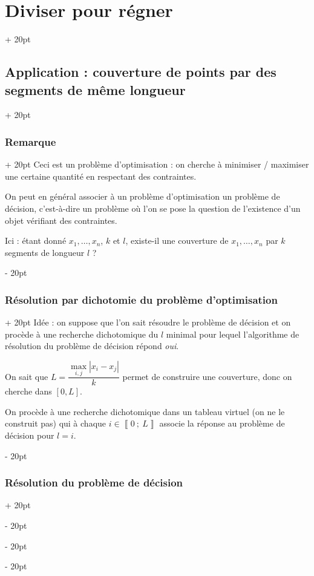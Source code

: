 \documentclass[a4paper, 12pt, twoside]{article}
\newcommand{\nset}[2]{\left\llbracket #1\ ;\ #2 \right\rrbracket}
\newcommand{\abs}[1]{\left\lvert #1 \right\rvert} %
\newcommand{\ind}[1][20pt]{\advance\leftskip + #1}
\newcommand{\deind}[1][20pt]{\advance\leftskip - #1}
\newenvironment{indt}[2][20pt]{#2 \par \ind[#1]}{\par \deind} %
\begin{document}
\begin{indt}{\section{Diviser pour régner}}
\begin{indt}{\subsection{Application : couverture de points par des segments de même longueur}}
            \vspace{12pt}
            
            \begin{indt}{\subsubsection{Remarque}}
                Ceci est un problème d'optimisation : on cherche à minimiser / maximiser une certaine quantité en respectant des contraintes.
                
                On peut en général associer à un problème d'optimisation un problème de décision, c'est-à-dire un problème où l'on se pose la question de l'existence d'un objet vérifiant des contraintes.
                
                Ici : étant donné $x_1, \ldots, x_n$, $k$ et $l$, existe-il une couverture de $x_1, \ldots, x_n$ par $k$ segments de longueur $l$ ?
            \end{indt}
            
            \vspace{12pt}
            
            \begin{indt}{\subsubsection{Résolution par dichotomie du problème d'optimisation}}
                Idée : on suppose que l'on sait résoudre le problème de décision et on procède à une recherche dichotomique du $l$ minimal pour lequel l'algorithme de résolution du problème de décision répond \textit{oui}.
                
                On sait que $L = \dfrac{\max\limits_{i, j}\abs{x_i - x_j}}{k}$ permet de construire une couverture, donc on cherche dans $[0, L]$.
                
                On procède à une recherche dichotomique dans un tableau virtuel (on ne le construit pas) qui à chaque $i \in \nset 0 L$ associe la réponse au problème de décision pour $l = i$.
            \end{indt}
            
            \vspace{12pt}
            
            \begin{indt}{\subsubsection{Résolution du problème de décision}}
                \label{2.3.4}
                

\end{indt}
\end{indt}
\end{indt}
\end{document}
